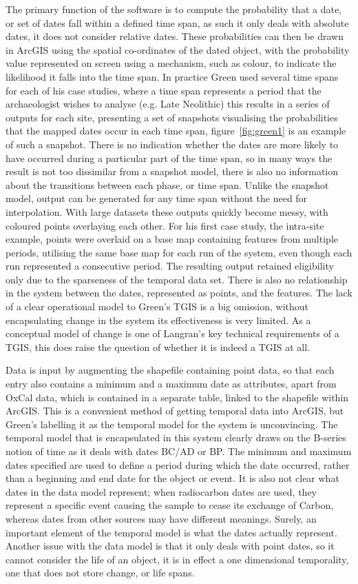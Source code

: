 The primary function of the software is to compute the probability that a date, or set of dates fall within a defined time span, as such it only deals with absolute dates, it does not consider relative dates. These probabilities can then be drawn in ArcGIS using the spatial co-ordinates of the dated object, with the probability value represented on screen using a mechanism, such as colour, to indicate the likelihood it falls into the time span. In practice Green used several time spans for each of his case studies, where a time span represents a period that the archaeologist wishes to analyse (e.g. Late Neolithic) this results in a series of outputs for each site, presenting a set of snapshots visualising the probabilities that the mapped dates occur in each time span, figure~\ref{fig:green1} is an example of such a snapshot. There is no indication whether the dates are more likely to have occurred during a particular part of the time span, so in many ways the result is not too dissimilar from a snapshot model, there is also no information about the transitions between each phase, or time span. Unlike the snapshot model, output can be generated for any time span without the need for interpolation. With large datasets these outputs quickly become messy, with coloured points overlaying each other. For his first case study, the intra-site example, points were overlaid on a base map containing features from multiple periods, utilising the same base map for each run of the system, even though each run represented a consecutive period. The resulting output retained eligibility only due to the sparseness of the temporal data set. There is also no relationship in the system between the dates, represented as points, and the features. The lack of a clear operational model to Green's TGIS is a big omission, without encapsulating change in the system its effectiveness is very limited. As a conceptual model of change is one of Langran's key technical requirements of a TGIS, this does raise the question of whether it is indeed a TGIS at all.

Data is input by augmenting the shapefile containing point data, so that each entry also contains a minimum and a maximum date as attributes, apart from OxCal data, which is contained in a separate table, linked to the shapefile within ArcGIS. This is a convenient method of getting temporal data into ArcGIS, but Green's labelling it as the temporal model for the system is unconvincing. The temporal model that is encapsulated in this system clearly draws on the B-series notion of time as it deals with dates BC/AD or BP. The minimum and maximum dates specified are used to define a period during which the date occurred, rather than a beginning and end date for the object or event. It is also not clear what dates in the data model represent; when radiocarbon dates are used, they represent a specific event causing the sample to cease its exchange of Carbon, whereas dates from other sources may have different meanings. Surely, an important element of the temporal model is what the dates actually represent. Another issue with the data model is that it only deals with point dates, so it cannot consider the life of an object, it is in effect a one dimensional temporality, one that does not store change, or life spans. 

